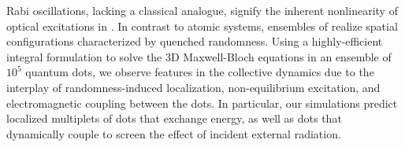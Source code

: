 Rabi oscillations, lacking a classical analogue, signify the inherent nonlinearity of optical excitations in \qds{}.
In contrast to atomic systems, ensembles of \qds{} realize spatial configurations characterized by quenched randomness.
Using a highly-efficient integral formulation to solve the 3D Maxwell-Bloch equations in an ensemble of $10^5$ quantum dots, we observe features in the collective dynamics due to the interplay of randomness-induced localization, non-equilibrium excitation, and electromagnetic coupling between the dots.
In particular, our simulations predict localized multiplets of dots that exchange energy, as well as dots that dynamically couple to screen the effect of incident external radiation.
